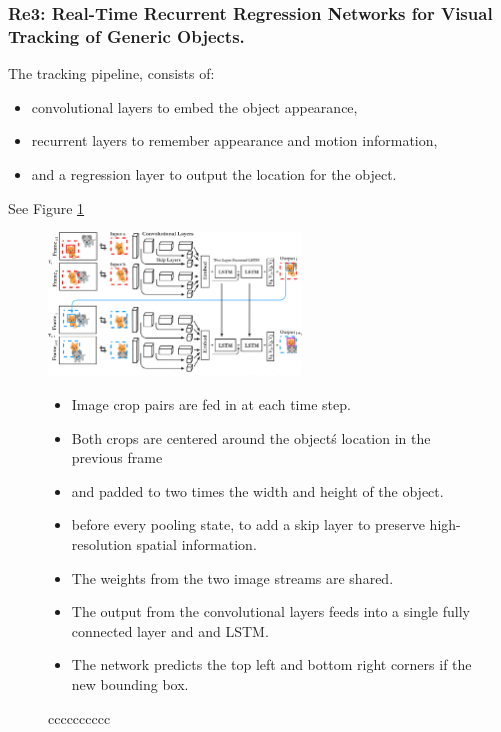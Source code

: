 \documentclass[a4paper]{article}
\begin{document}
\subsubsection{Re3: Real-Time Recurrent Regression Networks for Visual Tracking of Generic Objects.}

The tracking pipeline, consists of:
\begin{itemize}
    \item convolutional layers to embed the object appearance, 
    \item recurrent layers to remember appearance and motion information, 
    \item and a regression layer to output the location for the object. 
\end{itemize}
See Figure \ref{fig:re3}

\begin{figure}[hb]
    \centering
    \includegraphics[width=0.6\textwidth]{figures/pipeline-re3.png}
    \caption{
            cccccccccc
    }
    \label{fig:re3}
    \medskip
    \small 
        \begin{itemize}
        \item Image crop pairs are fed in at each time step.
        \item Both crops are centered around the object\'s location in the previous frame 
        \item and padded to two times the width and height of the object. 
        \item before every pooling state, to add a skip layer to preserve high-resolution spatial information.
        \item The weights from the two image streams are shared.
        \item The output from the convolutional layers feeds into a single fully connected layer and  and LSTM.
        \item The network predicts the top left and bottom right corners if the new bounding box.  
        \end{itemize}
\end{figure}
\end{document}
